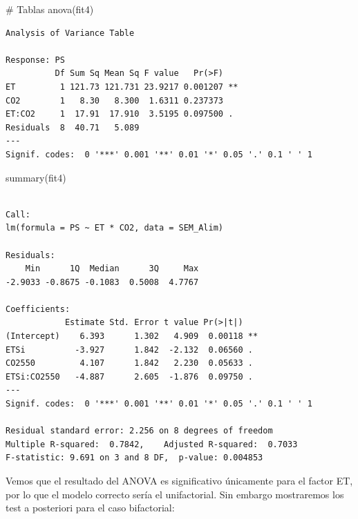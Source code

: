 \documentclass[
  letterpaper,
  DIV=11,
  numbers=noendperiod]{scrartcl}
\newenvironment{Shaded}{\begin{snugshade}}{\end{snugshade}}
\newcommand{\CommentTok}[1]{\textcolor[rgb]{0.37,0.37,0.37}{#1}}
\newcommand{\FunctionTok}[1]{\textcolor[rgb]{0.28,0.35,0.67}{#1}}
\newcommand{\NormalTok}[1]{\textcolor[rgb]{0.00,0.23,0.31}{#1}}
\newcommand{\OtherTok}[1]{\textcolor[rgb]{0.00,0.23,0.31}{#1}}
\newcommand{\SpecialCharTok}[1]{\textcolor[rgb]{0.37,0.37,0.37}{#1}}
\newcommand{\StringTok}[1]{\textcolor[rgb]{0.13,0.47,0.30}{#1}}
\begin{document}
\begin{Shaded}
\begin{Highlighting}[]
\CommentTok{\# Tablas}
\FunctionTok{anova}\NormalTok{(fit4)}
\end{Highlighting}
\end{Shaded}

\begin{verbatim}
Analysis of Variance Table

Response: PS
          Df Sum Sq Mean Sq F value   Pr(>F)   
ET         1 121.73 121.731 23.9217 0.001207 **
CO2        1   8.30   8.300  1.6311 0.237373   
ET:CO2     1  17.91  17.910  3.5195 0.097500 . 
Residuals  8  40.71   5.089                    
---
Signif. codes:  0 '***' 0.001 '**' 0.01 '*' 0.05 '.' 0.1 ' ' 1
\end{verbatim}

\begin{Shaded}
\begin{Highlighting}[]
\FunctionTok{summary}\NormalTok{(fit4)}
\end{Highlighting}
\end{Shaded}

\begin{verbatim}

Call:
lm(formula = PS ~ ET * CO2, data = SEM_Alim)

Residuals:
    Min      1Q  Median      3Q     Max 
-2.9033 -0.8675 -0.1083  0.5008  4.7767 

Coefficients:
            Estimate Std. Error t value Pr(>|t|)   
(Intercept)    6.393      1.302   4.909  0.00118 **
ETSi          -3.927      1.842  -2.132  0.06560 . 
CO2550         4.107      1.842   2.230  0.05633 . 
ETSi:CO2550   -4.887      2.605  -1.876  0.09750 . 
---
Signif. codes:  0 '***' 0.001 '**' 0.01 '*' 0.05 '.' 0.1 ' ' 1

Residual standard error: 2.256 on 8 degrees of freedom
Multiple R-squared:  0.7842,    Adjusted R-squared:  0.7033 
F-statistic: 9.691 on 3 and 8 DF,  p-value: 0.004853
\end{verbatim}

Vemos que el resultado del ANOVA es significativo únicamente para el
factor ET, por lo que el modelo correcto sería el unifactorial. Sin
embargo mostraremos los test a posteriori para el caso bifactorial:

\begin{Shaded}
\end{Shaded}
\end{document}
